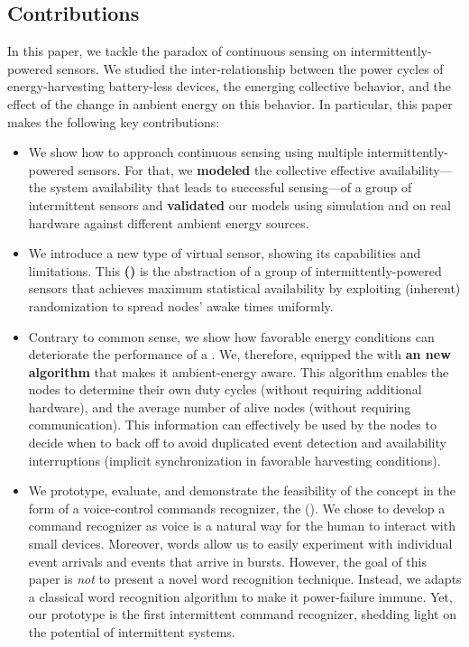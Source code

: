 \subsection{Contributions}
In this paper, we tackle the paradox of continuous sensing on intermittently-powered sensors. 
We studied the inter-relationship between the power cycles of energy-harvesting battery-less devices, the emerging collective behavior, and the effect of the change in ambient energy on this behavior. In particular, this paper makes the following key contributions:
\begin{itemize}
%
\item We show how to approach continuous sensing using multiple intermittently-powered sensors. 
For that, we \textbf{modeled} the collective effective availability---the system availability that leads to successful sensing---of a group of intermittent sensors and \textbf{validated} our models using simulation and on real hardware against different ambient energy sources. 
%
\item We introduce a new type of virtual sensor, showing its capabilities and limitations. This \textbf{\fullcis (\cis)} is the abstraction of a group of intermittently-powered sensors that achieves maximum statistical availability by exploiting (inherent) randomization to spread nodes' awake times uniformly.
% 
\item Contrary to common sense, we show how favorable energy conditions can deteriorate the performance of a \cis. We, therefore, equipped the \cis with \textbf{an new algorithm} that makes it ambient-energy aware. This algorithm enables the nodes to determine their own duty cycles (without requiring additional hardware), and the average number of alive nodes (without requiring communication). This information can effectively be used by the nodes to decide when to back off to avoid duplicated event detection and availability interruptions (implicit synchronization in favorable harvesting conditions).
%
\item We prototype, evaluate, and demonstrate the feasibility of the \fullcis concept in the form of a voice-control commands recognizer, the \textbf{\fullCIM} (\textbf{\cim}). 
We chose to develop a command recognizer as 
voice is a natural way for the human to interact with small devices. Moreover, words allow us to easily experiment with individual event arrivals and events that arrive in bursts. 
However, the goal of this paper is \emph{not} to present a novel word recognition technique. 
Instead, we adapts a classical word recognition algorithm to make it power-failure immune. Yet, our \cim prototype is the first intermittent command recognizer, shedding light on the potential of intermittent systems. 

\end{itemize}





















